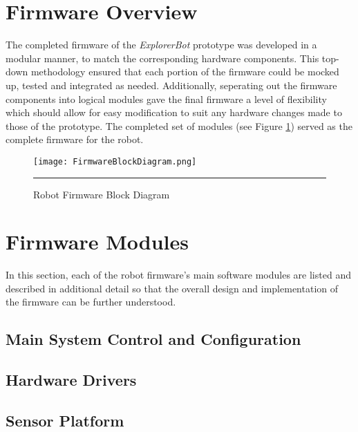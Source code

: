 \section{Firmware Overview}

The completed firmware of the \textit{ExplorerBot} prototype was developed in a modular manner, to match the corresponding hardware components. This top-down methodology ensured that each portion of the firmware could be mocked up, tested and integrated as needed. Additionally, seperating out the firmware components into logical modules gave the final firmware a level of flexibility which should allow for easy modification to suit any hardware changes made to those of the prototype. The completed set of modules (see Figure \ref{fig:robotblockfw}) served as the complete firmware for the robot.

\begin{figure}[H]
	\vspace{1em}
	\centering
		\texttt{[image: FirmwareBlockDiagram.png]}
	\rule{35em}{0.5pt}
	\caption[Firmware Block Diagram]{Robot Firmware Block Diagram}
	\label{fig:robotblockfw}
\end{figure}

\section{Firmware Modules}

In this section, each of the robot firmware's main software modules are listed and described in additional detail so that the overall design and implementation of the firmware can be further understood.

\FloatBarrier
\subsection{Main System Control and Configuration}


\FloatBarrier
\subsection{Hardware Drivers}


\FloatBarrier
\subsection{Sensor Platform}


